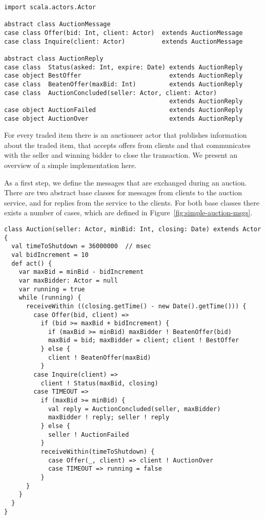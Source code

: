 \begin{lstlisting}[style=floating,label=fig:simple-auction-msgs,caption=Message
    Classes for an Auction Service]
import scala.actors.Actor

abstract class AuctionMessage
case class Offer(bid: Int, client: Actor)  extends AuctionMessage
case class Inquire(client: Actor)          extends AuctionMessage

abstract class AuctionReply
case class  Status(asked: Int, expire: Date) extends AuctionReply
case object BestOffer                        extends AuctionReply
case class  BeatenOffer(maxBid: Int)         extends AuctionReply
case class  AuctionConcluded(seller: Actor, client: Actor) 
                                             extends AuctionReply
case object AuctionFailed                    extends AuctionReply
case object AuctionOver                      extends AuctionReply
\end{lstlisting}

For every traded item there is an auctioneer actor that publishes
information about the traded item, that accepts offers from clients
and that communicates with the seller and winning bidder to close the
transaction. We present an overview of a simple implementation
here.

As a first step, we define the messages that are exchanged during an
auction. There are two abstract base classes
 for messages from clients to the auction
service, and  for replies from the service to the
clients.  For both base classes there exists a number of cases, which
are defined in Figure~\ref{fig:simple-auction-msgs}.

\begin{lstlisting}[style=floating,label=fig:simple-auction,caption=Implementation of an Auction Service]
class Auction(seller: Actor, minBid: Int, closing: Date) extends Actor {
  val timeToShutdown = 36000000  // msec
  val bidIncrement = 10
  def act() {
    var maxBid = minBid - bidIncrement
    var maxBidder: Actor = null
    var running = true
    while (running) {
      receiveWithin ((closing.getTime() - new Date().getTime())) {
        case Offer(bid, client) =>
          if (bid >= maxBid + bidIncrement) { 
            if (maxBid >= minBid) maxBidder ! BeatenOffer(bid)
            maxBid = bid; maxBidder = client; client ! BestOffer
          } else {
            client ! BeatenOffer(maxBid)
          }
        case Inquire(client) =>
          client ! Status(maxBid, closing)
        case TIMEOUT =>
          if (maxBid >= minBid) {
            val reply = AuctionConcluded(seller, maxBidder)
            maxBidder ! reply; seller ! reply
          } else {
            seller ! AuctionFailed
          }
          receiveWithin(timeToShutdown) {
            case Offer(_, client) => client ! AuctionOver
            case TIMEOUT => running = false
          }
      }
    }
  } 
}
\end{lstlisting}

